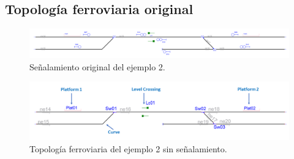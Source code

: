 \subsection{Topología ferroviaria original}

\lipsum[2]


\begin{figure}[H]
	\centering
	\includegraphics[width=1\textwidth]{resultados-obtenidos/ejemplo2/images/2_original.png}
	\centering\caption{Señalamiento original del ejemplo 2.}
\end{figure}

\lipsum[2]

\begin{figure}[H]
	\centering
	\includegraphics[width=1\textwidth]{resultados-obtenidos/ejemplo2/images/2_empty.png}
	\centering\caption{Topología ferroviaria del ejemplo 2 sin señalamiento.}
\end{figure}

\lipsum[2]
